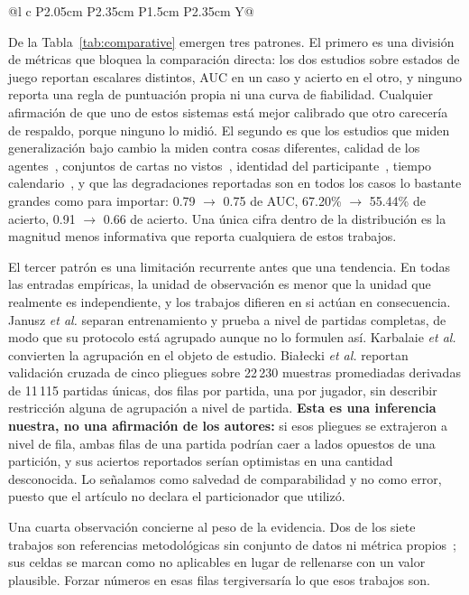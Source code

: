 \documentclass[conference]{IEEEtran}
\begin{document}
\begin{table}[!tp]
\begin{tabularx}{\textwidth}{@{}l c P{2.05cm} P{2.35cm} P{1.5cm} P{2.35cm} Y@{}}
\bottomrule
\end{tabularx}
\end{table}

De la Tabla~\ref{tab:comparative} emergen tres patrones. El primero es una
divisi\'on de m\'etricas que bloquea la comparaci\'on directa: los dos
estudios sobre estados de juego reportan escalares distintos, AUC en un caso
y acierto en el otro, y ninguno reporta una regla de puntuaci\'on propia ni
una curva de fiabilidad. Cualquier afirmaci\'on de que uno de estos sistemas
est\'a mejor calibrado que otro carecer\'ia de respaldo, porque ninguno lo
midi\'o. El segundo es que los estudios que miden generalizaci\'on bajo
cambio la miden contra cosas diferentes, calidad de los
agentes~\cite{janusz_hearthstone_2017}, conjuntos de cartas no
vistos~\cite{bertram_cardrepresentations_2024}, identidad del
participante~\cite{karbalaie_participantaware_2026}, tiempo
calendario~\cite{guo_temporalshift_2021}, y que las degradaciones
reportadas son en todos los casos lo bastante grandes como para importar:
0.79 $\rightarrow$ 0.75 de AUC, 67.20\% $\rightarrow$ 55.44\% de
acierto, 0.91 $\rightarrow$ 0.66 de acierto. Una \'unica cifra dentro de la
distribuci\'on es la magnitud menos informativa que reporta cualquiera de
estos trabajos.

El tercer patr\'on es una limitaci\'on recurrente antes que una tendencia.
En todas las entradas emp\'iricas, la unidad de observaci\'on es menor que
la unidad que realmente es independiente, y los trabajos difieren en si
act\'uan en consecuencia. Janusz \textit{et al.} separan entrenamiento y
prueba a nivel de partidas completas, de modo que su protocolo est\'a
agrupado aunque no lo formulen as\'i. Karbalaie \textit{et al.} convierten
la agrupaci\'on en el objeto de estudio. Bia\l ecki \textit{et al.} reportan
validaci\'on cruzada de cinco pliegues sobre 22\,230 muestras promediadas
derivadas de 11\,115 partidas \'unicas, dos filas por partida, una por
jugador, sin describir restricci\'on alguna de agrupaci\'on a nivel de
partida. \textbf{Esta es una inferencia nuestra, no una afirmaci\'on de los
autores:} si esos pliegues se extrajeron a nivel de fila, ambas filas de una
partida podr\'ian caer a lados opuestos de una partici\'on, y sus aciertos
reportados ser\'ian optimistas en una cantidad desconocida. Lo se\~nalamos
como salvedad de comparabilidad y no como error, puesto que el art\'iculo no
declara el particionador que utiliz\'o.

Una cuarta observaci\'on concierne al peso de la evidencia. Dos de los siete
trabajos son referencias metodol\'ogicas sin conjunto de datos ni m\'etrica
propios~\cite{kaufman_leakage_2011,sasse_leakage_2025}; sus celdas se marcan
como no aplicables en lugar de rellenarse con un valor plausible. Forzar
n\'umeros en esas filas tergiversar\'ia lo que esos trabajos son.
\end{document}
